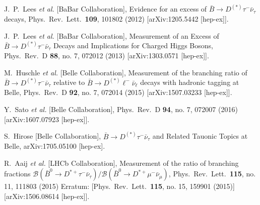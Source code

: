\documentclass[reprint,showpacs,aps,prd,nofootinbib,superscriptaddress,longbibliography]{revtex4-1}
\begin{document}
\begin{thebibliography}{99}


  J.~P.~Lees {\it et al.} [BaBar Collaboration],
  Evidence for an excess of $\bar{B} \to D^{(*)} \tau^-\bar{\nu}_\tau$ decays,
  Phys.\ Rev.\ Lett.\  {\bf 109}, 101802 (2012)
  [arXiv:1205.5442 [hep-ex]].
  
  J.~P.~Lees {\it et al.} [BaBar Collaboration],
  Measurement of an Excess of $\bar{B} \to D^{(*)}\tau^- \bar{\nu}_\tau$ Decays and Implications for Charged Higgs Bosons,
  Phys.\ Rev.\ D {\bf 88}, no. 7, 072012 (2013)
  [arXiv:1303.0571 [hep-ex]].


  M.~Huschle {\it et al.} [Belle Collaboration],
  Measurement of the branching ratio of $\bar{B} \to D^{(\ast)} \tau^- \bar{\nu}_\tau$ relative to $\bar{B} \to D^{(\ast)} \ell^- \bar{\nu}_\ell$ decays with hadronic tagging at Belle,
  Phys.\ Rev.\ D {\bf 92}, no. 7, 072014 (2015)
  [arXiv:1507.03233 [hep-ex]].


  Y.~Sato {\it et al.} [Belle Collaboration],
  Phys.\ Rev.\ D {\bf 94}, no. 7, 072007 (2016)
  [arXiv:1607.07923 [hep-ex]].
  
  S.~Hirose [Belle Collaboration],
  $\bar{B} \rightarrow D^{(*)} \tau^- \bar{\nu}_\tau$ and Related Tauonic Topics at Belle,
  arXiv:1705.05100 [hep-ex].
  
  R.~Aaij {\it et al.} [LHCb Collaboration],
  Measurement of the ratio of branching fractions $\mathcal{B}(\bar{B}^0 \to D^{*+}\tau^{-}\bar{\nu}_{\tau})/\mathcal{B}(\bar{B}^0 \to D^{*+}\mu^{-}\bar{\nu}_{\mu})$,
  Phys.\ Rev.\ Lett.\  {\bf 115}, no. 11, 111803 (2015)
  Erratum: [Phys.\ Rev.\ Lett.\  {\bf 115}, no. 15, 159901 (2015)]
  [arXiv:1506.08614 [hep-ex]].



\end{thebibliography}
\end{document}
